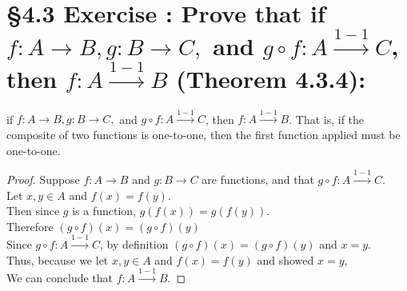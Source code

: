\documentclass[a4paper,11pt]{article}
\begin{document}
\section*{\S 4.3 Exercise : Prove that if \(f:A \rightarrow B, g:B \rightarrow C,\) and \(g \circ f: A \xrightarrow{1-1} C\), then \(f:A \xrightarrow{1-1} B\) (Theorem 4.3.4):}
\setcounter{SubsectionCounter}{1}
\begin{theorem1}
if \(f:A \rightarrow B, g:B \rightarrow C,\) and \(g \circ f: A \xrightarrow{1-1} C\), then \(f:A \xrightarrow{1-1} 
B\). That is, if the composite of two functions is one-to-one, then the first 
function applied must be one-to-one.
\begin{proof}Suppose \(f: A \rightarrow B\) and \(g:B \rightarrow C\) are functions, and that \(g \circ f: A \xrightarrow{1-1} C\).\\
Let \(x,y \in A\) and \(f{(x)} = f{(y)}\).\\
Then since \(g\) is a function, \(g{(f{(x)})} = g{(f{(y)})}\).\\
Therefore \({(g \circ f)}{(x)} = {(g \circ f)}{(y)}\)\\
Since \(g \circ f: A \xrightarrow{1-1} C\), by definition \({(g \circ f)}{(x)} = {(g \circ f)}{(y)}\) and 
\(x=y\).\\
Thus, because we let \(x,y \in A\) and \(f{(x)}=f{(y)}\) and showed \(x=y\),\\
We can conclude that \(f:A \xrightarrow{1-1} B\).
  \end{proof}
\end{theorem1}
\newpage
\addtocounter{ProblemCounter}{1}
\end{document}
